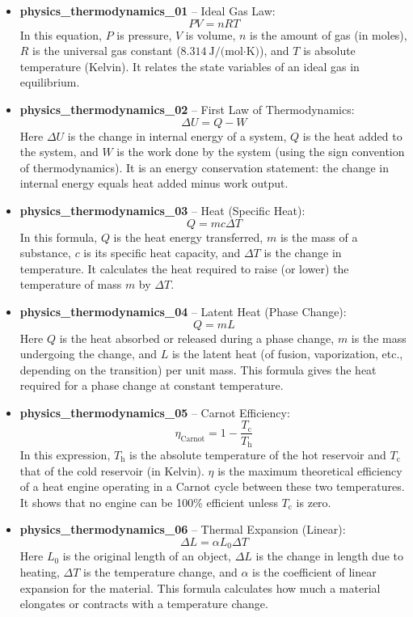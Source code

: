 \documentclass[11pt,a4paper]{article}
\begin{document}
\begin{itemize}
\item \textbf{physics\_thermodynamics\_01} -- Ideal Gas Law: 
\[PV = nRT\]
In this equation, $P$ is pressure, $V$ is volume, $n$ is the amount of gas (in moles), $R$ is the universal gas constant ($8.314\ \text{J/(mol·K)}$), and $T$ is absolute temperature (Kelvin). It relates the state variables of an ideal gas in equilibrium.

\item \textbf{physics\_thermodynamics\_02} -- First Law of Thermodynamics: 
\[\Delta U = Q - W\]
Here $\Delta U$ is the change in internal energy of a system, $Q$ is the heat added to the system, and $W$ is the work done by the system (using the sign convention of thermodynamics). It is an energy conservation statement: the change in internal energy equals heat added minus work output.

\item \textbf{physics\_thermodynamics\_03} -- Heat (Specific Heat): 
\[Q = mc\Delta T\]
In this formula, $Q$ is the heat energy transferred, $m$ is the mass of a substance, $c$ is its specific heat capacity, and $\Delta T$ is the change in temperature. It calculates the heat required to raise (or lower) the temperature of mass $m$ by $\Delta T$.

\item \textbf{physics\_thermodynamics\_04} -- Latent Heat (Phase Change): 
\[Q = mL\]
Here $Q$ is the heat absorbed or released during a phase change, $m$ is the mass undergoing the change, and $L$ is the latent heat (of fusion, vaporization, etc., depending on the transition) per unit mass. This formula gives the heat required for a phase change at constant temperature.

\item \textbf{physics\_thermodynamics\_05} -- Carnot Efficiency: 
\[\eta_{\text{Carnot}} = 1 - \frac{T_{\text{c}}}{T_{\text{h}}}\]
In this expression, $T_{\text{h}}$ is the absolute temperature of the hot reservoir and $T_{\text{c}}$ that of the cold reservoir (in Kelvin). $\eta$ is the maximum theoretical efficiency of a heat engine operating in a Carnot cycle between these two temperatures. It shows that no engine can be 100\% efficient unless $T_{\text{c}}$ is zero.

\item \textbf{physics\_thermodynamics\_06} -- Thermal Expansion (Linear): 
\[\Delta L = \alpha L_0 \Delta T\]
Here $L_0$ is the original length of an object, $\Delta L$ is the change in length due to heating, $\Delta T$ is the temperature change, and $\alpha$ is the coefficient of linear expansion for the material. This formula calculates how much a material elongates or contracts with a temperature change.
\end{itemize}
\end{document}
